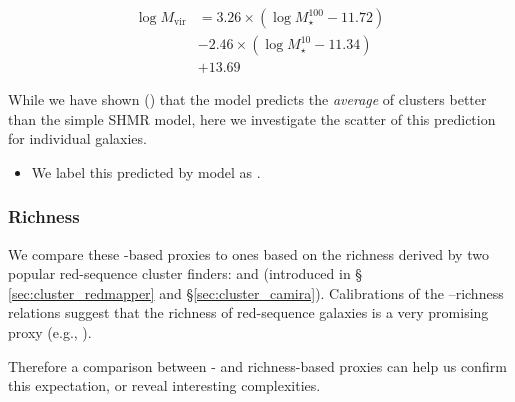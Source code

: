 \documentclass[fleqn,usenatbib,useAMS,english]{mnras}
\begin{document}
    \begin{equation}
        \begin{aligned}
        \log M_{\mathrm{vir}} &=3.26 \times\left(\log M_{\star}^{100}-11.72\right) \\
        &-2.46 \times\left(\log M_{\star}^{10}-11.34\right) \\
        &+13.69
        \end{aligned}
        \label{eq:asap}
    \end{equation}

    While we have shown (\citealt{Huang2020}) that the \asap{} model predicts the
    {\em average} \mvir{} of clusters
    better than the simple SHMR model, here we investigate the scatter of this
    prediction for individual galaxies.

    \begin{itemize}

        \item We label this \mvir{} predicted by \asap{} model as \masap{}.

    \end{itemize}

\subsubsection{Richness}
    \label{sec:proxy_richness}

    We compare these \mstar{}-based proxies to ones based on the richness derived by two popular
    red-sequence cluster finders: \redm{} and \camira{} (introduced in \S
    \ref{sec:cluster_redmapper} and \S \ref{sec:cluster_camira}).
    Calibrations of the \mvir{}--richness relations suggest that the richness of
    red-sequence galaxies is a very promising \mvir{} proxy (e.g.,
    \citealt{Melchior2017, Murata2018, McClintock2019}).
    
    Therefore a \topn{} comparison between \mvir{}- and richness-based proxies can help us
    confirm this expectation, or reveal interesting complexities.
\end{document}
